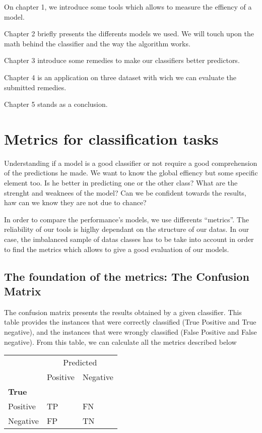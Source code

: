 \documentclass[
]{book}
\begin{document}
On chapter 1, we introduce some tools which allows to measure the effiency of a model.

Chapter 2 briefly presents the differents models we used. We will touch upon the math behind the classifier and the way the algorithm works.

Chapter 3 introduce some remedies to make our classifiers better predictors.

Chapter 4 is an application on three dataset with wich we can evaluate the submitted remedies.

Chapter 5 stands as a conclusion.

\hypertarget{metrics-for-classification-tasks}{%
\chapter{Metrics for classification tasks}\label{metrics-for-classification-tasks}}

Understanding if a model is a good classifier or not require a good comprehension of the predictions he made. We want to know the global effiency but some specific element too. Is he better in predicting one or the other class? What are the strenght and weaknees of the model? Can we be confident towards the results, haw can we know they are not due to chance?

In order to compare the performance's models, we use differents ``metrics''. The reliability of our tools is higlhy dependant on the structure of our datas. In our case, the imbalanced sample of datas classes has to be take into account in order to find the metrics which allows to give a good evaluation of our models.

\hypertarget{the-foundation-of-the-metrics-the-confusion-matrix}{%
\section{The foundation of the metrics: The Confusion Matrix}\label{the-foundation-of-the-metrics-the-confusion-matrix}}

The confusion matrix presents the results obtained by a given classifier. This table provides the instances that were correctly classified (True Positive and True negative), and the instances that were wrongly classified (False Positive and False negative).
From this table, we can calculate all the metrics described below

\begin{table}
\centering
\begin{tabular}{l|l|l}
\hline
\multicolumn{1}{c|}{ } & \multicolumn{2}{c}{Predicted} \\
\cline{2-3}
  & Positive & Negative\\
\hline
\multicolumn{3}{l}{\textbf{True}}\\
\hline
\hspace{1em}Positive & TP & FN\\
\hline
\hspace{1em}Negative & FP & TN\\
\hline
\end{tabular}
\end{table}
\end{document}
